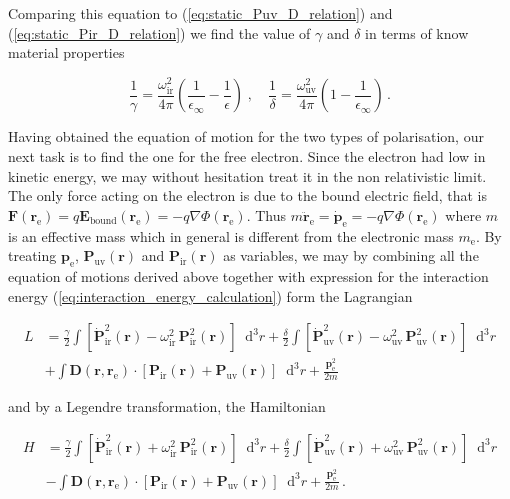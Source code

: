 \documentclass[12pt]{report}
\renewcommand{\vec}[1]{\boldsymbol{\mathbf{#1}}}                        %
\newcommand*\diff{\mathop{}\!\mathrm{d}}
\begin{document}
Comparing this equation to (\ref{eq:static_Puv_D_relation}) and (\ref{eq:static_Pir_D_relation}) we find the value of $ \gamma $ and $ \delta $ in terms of know material properties

\begin{equation}
	\frac{1}{\gamma} = \frac{\omega_\text{ir}^2}{4 \pi} \left( \frac{1}{\epsilon_\infty} - \frac{1}{\epsilon} \right)
	\; , \quad
	\frac{1}{\delta} = \frac{\omega_\text{uv}^2}{4 \pi} \left( 1 - \frac{1}{\epsilon_\infty} \right) \,.
\end{equation}

Having obtained the equation of motion for the two types of polarisation, our next task is to find the one for the free electron. Since the electron had low in kinetic energy, we may without hesitation treat it in the non relativistic limit. The only force acting on the electron is due to the bound electric field, that is $ \vec F(\vec r_\text{e}) = q \vec E_\text{bound} (\vec r_\text{e}) = - q \nabla \Phi (\vec r_\text{e}) $. Thus $ m \ddot{\vec r}_\text{e} = \dot{\vec p}_\text{e} = - q \nabla \Phi (\vec r_\text{e}) $ where $ m $ is an effective mass which in general is different from the electronic mass $ m_\text{e} $. By treating $ \vec p_\text{e} $,  $ \vec P_\text{uv} (\vec r) $ and $ \vec P_\text{ir} (\vec r) $ as variables, we may by combining all the equation of motions derived above together with expression for the interaction energy (\ref{eq:interaction_energy_calculation}) form the Lagrangian

\begin{equation}
	\begin{split}
		L &= \frac{\gamma}{2} \int \left[ \dot{\vec P}_\text{ir}^2 (\vec r) - \omega_\text{ir}^2 \, \vec P_\text{ir}^2 (\vec r) \right] \diff^3 r
		+ \frac{\delta}{2} \int \left[ \dot{\vec P}_\text{uv}^2 (\vec r) - \omega_\text{uv}^2 \, \vec P_\text{uv}^2 (\vec r) \right] \diff^3 r \\
		&+ \int \vec D(\vec r, \vec r_\text{e}) \cdot \left[ \vec P_\text{ir}(\vec r) +  \vec P_\text{uv}(\vec r) \right] \diff^3 r
		+ \frac{\vec p_\text{e}^2}{2m}
	\end{split}
\end{equation}

and by a Legendre transformation, the Hamiltonian

\begin{equation}
	\label{eq:Hamiltonian_raw}
	\begin{split}
		H &= \frac{\gamma}{2} \int \left[ \dot{\vec P}_\text{ir}^2 (\vec r) + \omega_\text{ir}^2 \, \vec P_\text{ir}^2 (\vec r) \right] \diff^3 r
		+ \frac{\delta}{2} \int \left[ \dot{\vec P}_\text{uv}^2 (\vec r) + \omega_\text{uv}^2 \, \vec P_\text{uv}^2 (\vec r) \right] \diff^3 r \\
		&- \int \vec D(\vec r, \vec r_\text{e}) \cdot \left[ \vec P_\text{ir}(\vec r) +  \vec P_\text{uv}(\vec r) \right] \diff^3 r
		+ \frac{\vec p_\text{e}^2}{2m}	\,.
	\end{split}
\end{equation}
\end{document}
